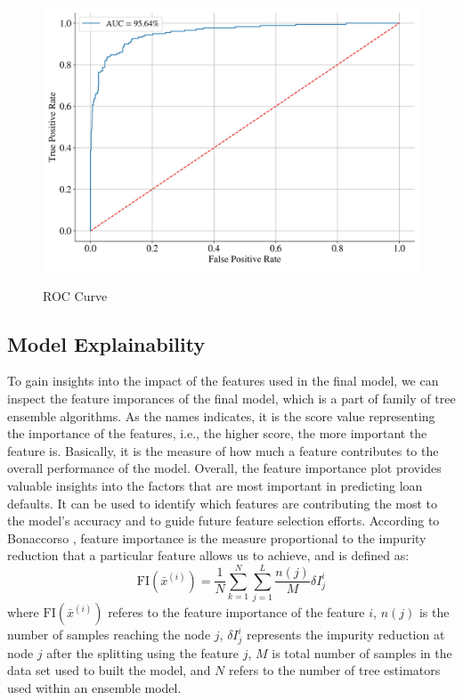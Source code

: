 \begin{figure}[H]
\centering
\caption{ROC Curve}\vspace{0.5em}
\label{fig:roc}\
\includegraphics[width=140mm]{Figures/ROC_curve_FINAL.jpg}
\vspace{-1em}
\end{figure}

\subsection{Model Explainability}
To gain insights into the impact of the features used in the final model, we can inspect the feature imporances of the final model, which is a part of family of tree ensemble algorithms.
As the names indicates, it is the score value representing the importance of the features, i.e., the higher score, the more important the feature is. Basically, it is the measure of how much a feature contributes to the overall performance of the model.
Overall, the feature importance plot provides valuable insights into the factors that are most important in predicting loan defaults. It can be used to identify which features are contributing the most to the model's accuracy and to guide future feature selection efforts.
According to Bonaccorso \citep{bonaccorso2020mastering}, feature importance is the measure proportional to the impurity reduction that a particular feature allows us to achieve, and is defined as:
\begin{equation}\label{eq}
    \text{FI}\left(\bar{x}^{\left(i\right)}\right) = \frac{1}{N} \displaystyle\sum_{k=1}^{N} \displaystyle\sum_{j=1}^{L} \frac{n(j)}{M} \delta I_{j}^{i}
\end{equation}
where $ \text{FI}\left(\bar{x}^{\left(i\right)}\right)$ referes to the feature importance of the feature $i$, $n(j)$ is the number of samples reaching the node $j$, $\delta I_{j}^{i}$ represents the impurity reduction at node $j$ after the splitting using the feature $j$, $M$ is total number of samples in the data set used to built the model, and $N$ refers to the number of tree estimators used within an ensemble model.

